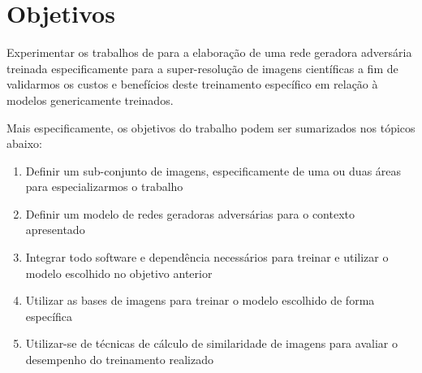 \section{Objetivos}

Experimentar os trabalhos de \cite{ledig_photo-realistic_2017, moreira_geracao_2019, wang_esrgan_2018} para a elaboração de uma rede geradora adversária treinada especificamente para a super-resolução de imagens científicas a fim de validarmos os custos e benefícios deste treinamento específico em relação à modelos genericamente treinados.

Mais especificamente, os objetivos do trabalho podem ser sumarizados nos tópicos abaixo:

\begin{enumerate}

    \item Definir um sub-conjunto de imagens, especificamente de uma ou duas áreas para especializarmos o trabalho

    \item Definir um modelo de redes geradoras adversárias para o contexto apresentado
	
    \item Integrar todo software e dependência necessários para treinar e utilizar o modelo escolhido no objetivo anterior
    
	\item Utilizar as bases de imagens para treinar o modelo escolhido de forma específica
	
	\item Utilizar-se de técnicas de cálculo de similaridade de imagens para avaliar o desempenho do treinamento realizado

\end{enumerate}
 
